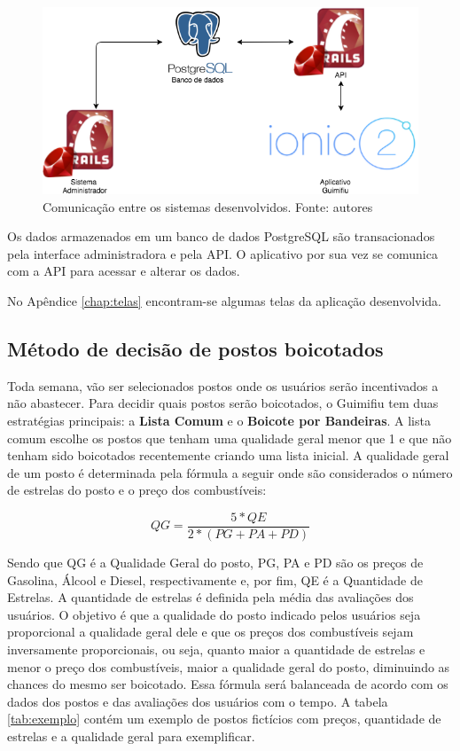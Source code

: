 \begin{figure}[H]
    \centering
    \includegraphics[scale=0.5]{figuras/comunicacao_sistemas.png}
    \caption[Comunicação entre os sistemas desenvolvidos.]{Comunicação entre os sistemas desenvolvidos. Fonte: autores}
    \label{img:comunicacaosistemas}
\end{figure}

Os dados armazenados em um banco de dados PostgreSQL são transacionados pela interface administradora e pela API. O aplicativo por sua vez se comunica com a API para acessar e alterar os dados.

No Apêndice \ref{chap:telas} encontram-se algumas telas da aplicação desenvolvida.

\subsection{Método de decisão de postos boicotados}
Toda semana, vão ser selecionados postos onde os usuários serão incentivados a não abastecer. Para decidir quais postos serão boicotados, o Guimifiu tem duas estratégias principais: a \textbf{Lista Comum} e o \textbf{Boicote por Bandeiras}. A lista comum escolhe os postos que tenham uma qualidade geral menor que 1 e que não tenham sido boicotados recentemente criando uma lista inicial. A qualidade geral de um posto é determinada pela fórmula a seguir onde são considerados o número de estrelas do posto e o preço dos combustíveis:

\begin{equation}
\label{Equação para cálculo de qualidade geral do Combustível}
	QG = \frac{5*QE}{2*(PG + PA + PD)}
\end{equation}

Sendo que QG é a Qualidade Geral do posto, PG, PA e PD são os preços de Gasolina, Álcool e Diesel, respectivamente e, por fim, QE é a Quantidade de Estrelas. A quantidade de estrelas é definida pela média das avaliações dos usuários. O objetivo é que a qualidade do posto indicado pelos usuários seja proporcional a qualidade geral dele e que os preços dos combustíveis sejam inversamente proporcionais, ou seja, quanto maior a quantidade de estrelas e menor o preço dos combustíveis, maior a qualidade geral do posto, diminuindo as chances do mesmo ser boicotado. Essa fórmula será balanceada de acordo com os dados dos postos e das avaliações dos usuários com o tempo. A tabela \ref{tab:exemplo} contém um exemplo de postos fictícios com preços, quantidade de estrelas e a qualidade geral para exemplificar.

